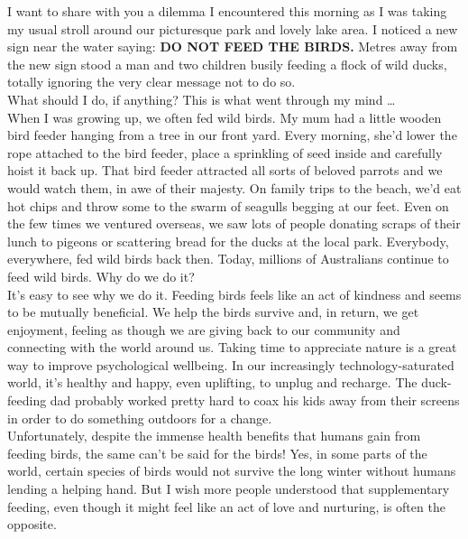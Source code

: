 \documentclass[a4paper]{article}
\begin{document}
I want to share with you a dilemma I encountered this morning as I was taking my usual stroll around our picturesque park and lovely lake area. I noticed a new sign near the water saying: \textbf{DO NOT FEED THE BIRDS.} Metres away from the new sign stood a man and two children busily feeding a flock of wild ducks, totally ignoring the very clear message not to do so.\\

What should I do, if anything? This is what went through my mind …\\

When I was growing up, we often fed wild birds. My mum had a little wooden bird feeder hanging from a tree in our front yard. Every morning, she’d lower the rope attached to the bird feeder, place a sprinkling of seed inside and carefully hoist it back up. That bird feeder attracted all sorts of beloved parrots and we would watch them, in awe of their majesty. On family trips to the beach, we’d eat hot chips and throw some to the swarm of seagulls begging at our feet. Even on the few times we ventured overseas, we saw lots of people donating scraps of their lunch to pigeons or scattering bread for the ducks at the local park. Everybody, everywhere, fed wild birds back then. Today, millions of Australians continue to feed wild birds. Why do we do it?\\

It’s easy to see why we do it. Feeding birds feels like an act of kindness and seems to be mutually beneficial. We help the birds survive and, in return, we get enjoyment, feeling as though we are giving back to our community and connecting with the world around us. Taking time to appreciate nature is a great way to improve psychological wellbeing. In our increasingly technology-saturated world, it’s healthy and happy, even uplifting, to unplug and recharge. The duck-feeding dad probably worked pretty hard to coax his kids away from their screens in order to do something outdoors for a change.\\

Unfortunately, despite the immense health benefits that humans gain from feeding birds, the same can’t be said for the birds! Yes, in some parts of the world, certain species of birds would not survive the long winter without humans lending a helping hand. But I wish more people understood that supplementary feeding, even though it might feel like an act of love and nurturing, is often the opposite.\\
\end{document}
